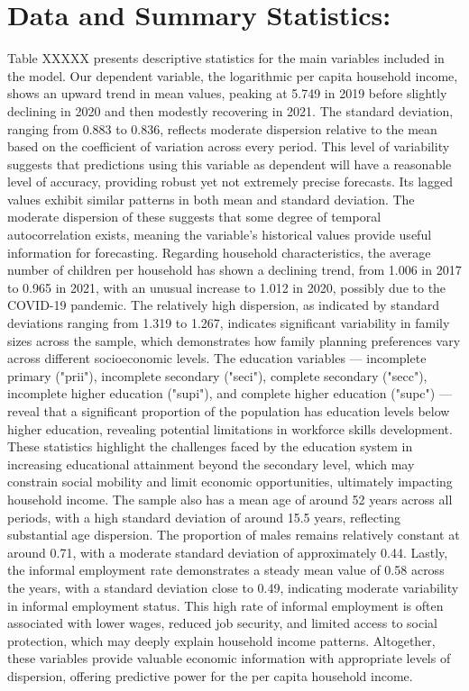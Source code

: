 \section{Data and Summary Statistics:}

Table XXXXX presents descriptive statistics for the main variables included in the model. Our dependent variable, the logarithmic per capita household income, shows an upward trend in mean values, peaking at 5.749 in 2019 before slightly declining in 2020 and then modestly recovering in 2021. The standard deviation, ranging from 0.883 to 0.836, reflects moderate dispersion relative to the mean based on the coefficient of variation across every period. This level of variability suggests that predictions using this variable as dependent will have a reasonable level of accuracy, providing robust yet not extremely precise forecasts. Its lagged values exhibit similar patterns in both mean and standard deviation. The moderate dispersion of these suggests that some degree of temporal autocorrelation exists, meaning the variable's historical values provide useful information for forecasting.
Regarding household characteristics, the average number of children per household has shown a declining trend, from 1.006 in 2017 to 0.965 in 2021, with an unusual increase to 1.012 in 2020, possibly due to the COVID-19 pandemic. The relatively high dispersion, as indicated by standard deviations ranging from 1.319 to 1.267, indicates significant variability in family sizes across the sample, which demonstrates how family planning preferences vary across different socioeconomic levels.
The education variables — incomplete primary ("prii"), incomplete secondary ("seci"), complete secondary ("secc"), incomplete higher education ("supi"), and complete higher education ("supc") — reveal that a significant proportion of the population has education levels below higher education, revealing potential limitations in workforce skills development. These statistics highlight the challenges faced by the education system in increasing educational attainment beyond the secondary level, which may constrain social mobility and limit economic opportunities, ultimately impacting household income.
The sample also has a mean age of around 52 years across all periods, with a high standard deviation of around 15.5 years, reflecting substantial age dispersion. The proportion of males remains relatively constant at around 0.71, with a moderate standard deviation of approximately 0.44.
Lastly, the informal employment rate demonstrates a steady mean value of 0.58 across the years, with a standard deviation close to 0.49, indicating moderate variability in informal employment status. This high rate of informal employment is often associated with lower wages, reduced job security, and limited access to social protection, which may deeply explain household income patterns. Altogether, these variables provide valuable economic information with appropriate levels of dispersion, offering predictive power for the per capita household income.


